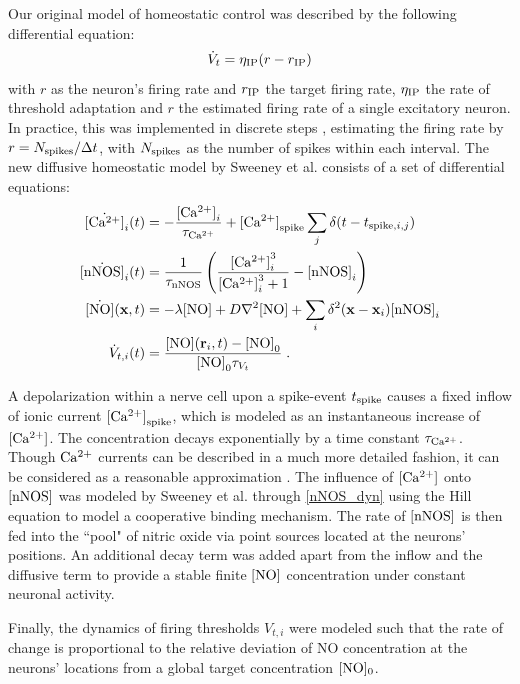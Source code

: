 \documentclass[10pt,letterpaper]{article}
\begin{document}
Our original model of homeostatic control was described by the following differential equation:
\begin{equation}
\dot{V}_t = \eta_{\rm IP}(r-r_{\rm IP}) \label{can_hom_rate}
\end{equation}
with $r$ as the neuron's firing rate and $r_{\rm IP}$ the target firing rate, $\eta_{\rm IP}$ the rate of threshold adaptation and $r$ the estimated firing rate of a single excitatory neuron. In practice, this was implemented in discrete steps , estimating the firing rate by $r = N_{\rm spikes} / \Delta t$, with $N_{\rm spikes}$ as the number of spikes within each interval. The new diffusive homeostatic model by Sweeney et al. consists of a set of differential equations:   
\begin{align}
\dot{{\rm [Ca^{2+}]}}_i(t) &= -\frac{{\rm [Ca^{2+}]}_i}{\tau_{\rm Ca^{2+}}} + {\rm [Ca^{2+}]}_{\rm spike} \sum_{j} \delta(t-t_{\mathrm{spike},i,j}) \label{Ca_dyn}\\
\dot{{\rm [nNOS]}}_i(t) &= \frac{1}{\tau_{\rm nNOS}} \left(\frac{{\rm [Ca^{2+}]}_i^3}{{\rm [Ca^{2+}]}_i^3+1} - {\rm [nNOS]}_i \right) \label{nNOS_dyn}\\
\dot{{\rm [NO]}}(\mathbf{x},t)&=-\lambda {\rm [NO]} + D \nabla^2 {\rm [NO]} + \sum_{i} \delta^2(\mathbf{x}-\mathbf{x}_i) {\rm [nNOS]}_i \label{NO_dyn}\\
\dot{V}_{t,i}(t) &= \frac{{\rm [NO]}(\mathbf{r}_{i},t)-{\rm [NO]}_0}{{\rm [NO]}_0 \tau_{V_t}} \; . \label{Theta_dyn}
\end{align}

A depolarization within a nerve cell upon a spike-event $t_{\rm spike}$ causes a fixed inflow of ionic current ${\rm [Ca^{2+}]}_{\rm spike}$, which is modeled as an instantaneous increase of $\rm [Ca^{2+}]$. The concentration decays exponentially by a time constant $\tau_{\rm Ca^{2+}}$. Though $\rm Ca^{2+}$ currents can be described in a much more detailed fashion, it can be considered as a reasonable approximation \cite[p.~198-203]{Theor_Neur_Dayan}. The influence of $\rm [Ca^{2+}]$ onto $\rm [nNOS]$ was modeled by Sweeney et al. through \eqref{nNOS_dyn} using the Hill equation \cite{Hill_Equ} to model a cooperative binding mechanism. The rate of $\rm [nNOS]$ is then fed into the ``pool" of nitric oxide via point sources located at the neurons' positions. An additional decay term was added apart from the inflow and the diffusive term to provide a stable finite $\rm [NO]$ concentration under constant neuronal activity.

Finally, the dynamics of firing thresholds $V_{t,i}$ were modeled such that the rate of change is proportional to the relative deviation of NO concentration at the neurons' locations from a global target concentration $\rm [NO]_0$. 
\end{document}
